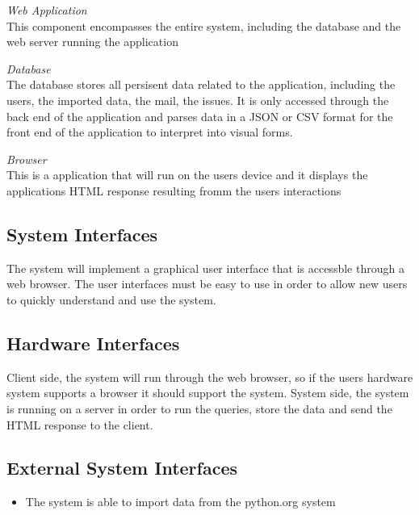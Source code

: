 	\begin{description}
	\item{\emph{Web Application}} \hfill \\ This component encompasses the entire system, including the database and the web server running the application
	\begin{description}
	\item{\emph{Database}} \hfill \\ The database stores all persisent data related to the application, including the users, the imported data, the mail, the issues. It is only accessed through the back end of the application and parses data in a JSON or CSV format for the front end of the application to interpret into visual forms.
	\end{description}
	\item{\emph{Browser}} \hfill \\ This is a application that will run on the users device and it displays the applications HTML response resulting fromm the users interactions
		\end{description}

\subsection{System Interfaces}
	
	The system will implement a graphical user interface that is accessble through a web browser. The user interfaces must be easy to use in order to allow new users to quickly understand and use the system.

\subsection{Hardware Interfaces}

	Client side, the system will run through the web browser, so if the users hardware system supports a browser it should support the system. System side, the system is running on a server in order to run the queries, store the data and send the HTML response to the client.

\subsection{External System Interfaces}

	\begin{itemize}
		\item The system is able to import data from the python.org system
	\end{itemize}

